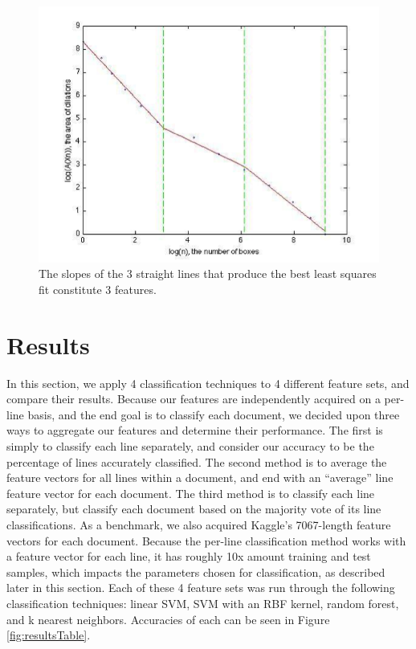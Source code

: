 \documentclass[paper=a4, fontsize=11pt]{scrartcl} %
\numberwithin{equation}{section} %
\numberwithin{figure}{section} %
\numberwithin{table}{section} %
\begin{document}
\begin{figure}
  \centering \includegraphics{fractaldimension.png}
  \caption{The slopes of the 3 straight lines that produce the best
    least squares fit constitute 3 features.}
  \label{fig:fractaldimension}
\end{figure}

\section{Results}
\label{sec:results}
In this section, we apply 4 classification techniques to 4 different
feature sets, and compare their results. Because our features are
independently acquired on a per-line basis, and the end goal is to
classify each document, we decided upon three ways to aggregate our
features and determine their performance. The first is simply to
classify each line separately, and consider our accuracy to be the
percentage of lines accurately classified. The second method is to
average the feature vectors for all lines within a document, and end
with an ``average'' line feature vector for each document. The third
method is to classify each line separately, but classify each document
based on the majority vote of its line classifications. As a
benchmark, we also acquired Kaggle's 7067-length feature vectors for
each document. Because the per-line classification method works with a
feature vector for each line, it has roughly 10x amount training and
test samples, which impacts the parameters chosen for classification,
as described later in this section. Each of these 4 feature sets was
run through the following classification techniques: linear SVM, SVM
with an RBF kernel, random forest, and k nearest neighbors. Accuracies
of each can be seen in Figure \ref{fig:resultsTable}.
\end{document}

